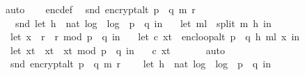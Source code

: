 \begin{isabellebody}
\ auto\isanewline
\isanewline
\ \ \isamarkupfalse%
\ enc{\isacharunderscore}{\kern0pt}def\ \isamarkupfalse%
\ {\isachardoublequoteopen}snd\ {\isacharparenleft}{\kern0pt}encrypt{\isacharunderscore}{\kern0pt}alt\ {\isacharparenleft}{\kern0pt}p\ {\isacharasterisk}{\kern0pt}\ q{\isacharparenright}{\kern0pt}\ m\ r{\isacharparenright}{\kern0pt}\ \isanewline
\ \ {\isacharequal}{\kern0pt}\ snd\ {\isacharparenleft}{\kern0pt}let\ h\ {\isacharequal}{\kern0pt}\ nat\ {\isasymlfloor}log\ {}\ {\isacharparenleft}{\kern0pt}log\ {}\ {\isacharparenleft}{\kern0pt}p\ {\isacharasterisk}{\kern0pt}\ q{\isacharparenright}{\kern0pt}{\isacharparenright}{\kern0pt}{\isasymrfloor}\ in\ \isanewline
\ \ let\ m{\isacharunderscore}{\kern0pt}l\ {\isacharequal}{\kern0pt}\ split\ m\ h\ in\ \isanewline
\ \ let\ x{\isacharunderscore}{\kern0pt}{}\ {\isacharequal}{\kern0pt}\ {\isacharparenleft}{\kern0pt}r\ {\isacharasterisk}{\kern0pt}\ r{\isacharparenright}{\kern0pt}\ mod\ {\isacharparenleft}{\kern0pt}p\ {\isacharasterisk}{\kern0pt}\ q{\isacharparenright}{\kern0pt}\ in\ \isanewline
\ \ let\ {\isacharparenleft}{\kern0pt}c{\isacharcomma}{\kern0pt}\ x{\isacharunderscore}{\kern0pt}t{\isacharparenright}{\kern0pt}\ {\isacharequal}{\kern0pt}\ enc{\isacharunderscore}{\kern0pt}loop{\isacharunderscore}{\kern0pt}alt\ {\isacharparenleft}{\kern0pt}p\ {\isacharasterisk}{\kern0pt}\ q{\isacharcomma}{\kern0pt}\ h{\isacharcomma}{\kern0pt}\ m{\isacharunderscore}{\kern0pt}l{\isacharparenright}{\kern0pt}\ x{\isacharunderscore}{\kern0pt}{}\ in\ \isanewline
\ \ let\ x{\isacharunderscore}{\kern0pt}t{\isacharprime}{\kern0pt}\ {\isacharequal}{\kern0pt}\ x{\isacharunderscore}{\kern0pt}t\ {\isacharasterisk}{\kern0pt}\ x{\isacharunderscore}{\kern0pt}t\ mod\ {\isacharparenleft}{\kern0pt}p\ {\isacharasterisk}{\kern0pt}\ q{\isacharparenright}{\kern0pt}\ in\ \isanewline
\ \ {\isacharparenleft}{\kern0pt}c{\isacharcomma}{\kern0pt}\ x{\isacharunderscore}{\kern0pt}t{\isacharprime}{\kern0pt}{\isacharparenright}{\kern0pt}{\isacharparenright}{\kern0pt}{\isachardoublequoteclose}\ \isanewline
\ \ \ \ \isamarkupfalse%
\ auto\isanewline
\isanewline
\ \ \isamarkupfalse%
\ \isamarkupfalse%
\ \ {\isachardoublequoteopen}snd\ {\isacharparenleft}{\kern0pt}encrypt{\isacharunderscore}{\kern0pt}alt\ {\isacharparenleft}{\kern0pt}p\ {\isacharasterisk}{\kern0pt}\ q{\isacharparenright}{\kern0pt}\ m\ r{\isacharparenright}{\kern0pt}\ \isanewline
\ \ {\isacharequal}{\kern0pt}\ {\isacharparenleft}{\kern0pt}let\ h\ {\isacharequal}{\kern0pt}\ nat\ {\isasymlfloor}log\ {}\ {\isacharparenleft}{\kern0pt}log\ {}\ {\isacharparenleft}{\kern0pt}p\ {\isacharasterisk}{\kern0pt}\ q{\isacharparenright}{\kern0pt}{\isacharparenright}{\kern0pt}{\isasymrfloor}\ in\ \isanewline

\end{isabellebody}
